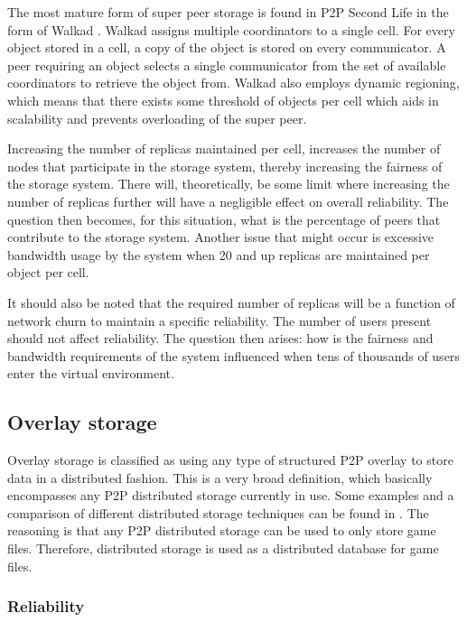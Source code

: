 The most mature form of super peer storage is found in P2P Second Life \cite{varvello_phd} in the form of Walkad \cite{Walkad_Varvello}. Walkad assigns multiple coordinators to a single cell. For every object stored in a cell, a copy of the object is stored on every communicator. A peer requiring an object selects a single communicator from the set of available coordinators to retrieve the object from. Walkad also employs dynamic regioning, which means that there exists some threshold of objects per cell which aids in scalability and prevents overloading of the super peer.

Increasing the number of replicas maintained per cell, increases the number of nodes that participate in the storage system, thereby increasing the fairness of the storage system. There will, theoretically, be some limit where increasing the number of replicas further will have a negligible effect on overall reliability. The question then becomes, for this situation, what is the percentage of peers that contribute to the storage system. Another issue that might occur is excessive bandwidth usage by the system when 20 and up replicas are maintained per object per cell.

It should also be noted that the required number of replicas will be a function of network churn to maintain a specific reliability. The number of users present should not affect reliability. The question then arises: how is the fairness and bandwidth requirements of the system influenced when tens of thousands of users enter the virtual environment.

\subsection{Overlay storage}
\label{overlay_storage}

Overlay storage is classified as using any type of structured P2P overlay to store data in a distributed fashion. This is a very broad definition, which basically encompasses any P2P distributed storage currently in use. Some examples and a comparison of different distributed storage techniques can be found in \cite{Hasan_distributed_storage_survey}. The reasoning is that any P2P distributed storage can be used to only store game files. Therefore, distributed storage is used as a distributed database for game files.

\subsubsection{Reliability}
\label{overlay_storage_reliability}


